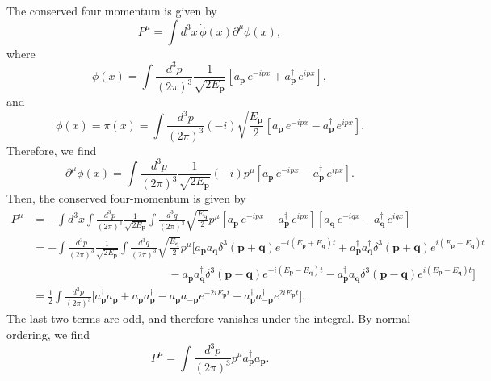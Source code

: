\begin{solution}
    The conserved four momentum is given by
    \begin{equation}
        P^\mu = \int d^3x \,\dot{\phi}(x)\partial^\mu\phi(x),
    \end{equation}
    where 
    \begin{equation}
        \phi(x) = \int\frac{d^3p}{(2\pi)^3}\frac{1}{\sqrt{2E_\mathbf{p}}}\left[a_{\mathbf{p}}\,e^{-ipx} + a_{\mathbf{p}}^\dagger\,e^{ipx}\right],
    \end{equation}
    and
    \begin{equation}
        \dot{\phi}(x) = \pi(x) =\int \frac{d^3p}{(2\pi)^3}(-i)\sqrt{\frac{E_{\mathbf{p}}}{2}}\left[a_{\mathbf{p}}\,e^{-ipx} - a_{\mathbf{p}}^\dagger\,e^{ipx}\right].
    \end{equation}
    Therefore, we find
    \begin{equation}
        \partial^\mu\phi(x) = \int\frac{d^3p}{(2\pi)^3}\frac{1}{\sqrt{2E_\mathbf{p}}}(-i)p^\mu\left[a_{\mathbf{p}}\,e^{-ipx} - a_{\mathbf{p}}^\dagger\,e^{ipx}\right].
    \end{equation}
    Then, the conserved four-momentum is given by
    \begin{equation}
    \begin{aligned}
        P^\mu &= -\int d^3x\int\frac{d^3p}{(2\pi)^3}\frac{1}{\sqrt{2E_\mathbf{p}}}\int\frac{d^3q}{(2\pi)^3}\sqrt{\frac{E_{\mathbf{q}}}{2}}p^\mu\left[a_{\mathbf{p}}\,e^{-ipx} - a_{\mathbf{p}}^\dagger\,e^{ipx}\right]\left[a_{\mathbf{q}}\,e^{-iqx} - a_{\mathbf{q}}^\dagger\,e^{iqx}\right]\\
        &=-\int\frac{d^3p}{(2\pi)^3}\frac{1}{\sqrt{2E_\mathbf{p}}}\int\frac{d^3q}{(2\pi)^3}\sqrt{\frac{E_{\mathbf{q}}}{2}}p^\mu\bigg[a_\mathbf{p}a_\mathbf{q}\delta^3(\mathbf{p}+\mathbf{q})e^{-i(E_\mathbf{p}+E_\mathbf{q})t} + a_\mathbf{p}^\dagger a_\mathbf{q}^\dagger\delta^3(\mathbf{p}+\mathbf{q})e^{i(E_\mathbf{p}+E_\mathbf{q})t}\\
        &\qquad \qquad \qquad \qquad\qquad\qquad - a_\mathbf{p} a_\mathbf{q}^\dagger\delta^3(\mathbf{p}-\mathbf{q})e^{-i(E_\mathbf{p}-E_\mathbf{q})t} - a_\mathbf{p}^\dagger a_\mathbf{q}\delta^3(\mathbf{p}-\mathbf{q})e^{i(E_\mathbf{p}-E_\mathbf{q})t}\bigg]\\
        &=\frac{1}{2}\int\frac{d^3p}{(2\pi)^3}\bigg[a_\mathbf{p}^\dagger a_\mathbf{p} + a_\mathbf{p} a_\mathbf{p}^\dagger - a_\mathbf{p}a_{-\mathbf{p}}e^{-2iE_\mathbf{p}t} -a_\mathbf{p}^\dagger a_{-\mathbf{p}}^\dagger e^{2iE_\mathbf{p}t}\bigg].
    \end{aligned}
    \end{equation}
    The last two terms are odd, and therefore vanishes under the integral. By normal ordering, we find
    \begin{equation}
        P^\mu = \int\frac{d^3p}{(2\pi)^3}p^\mu a_\mathbf{p}^\dagger a_\mathbf{p}.
    \end{equation}


\end{solution}
